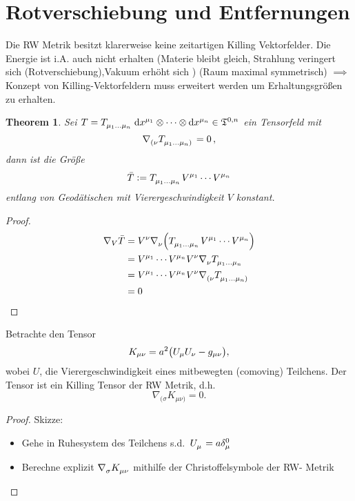 \documentclass[10pt,oneside,a4paper]{scrartcl}
\let\originalleft\left  %
\let\originalright\right
\renewcommand{\left}{\mathopen{}\mathclose\bgroup\originalleft}
\renewcommand{\right}{\aftergroup\egroup\originalright}
\newtheorem{theorem}{Theorem}
\theoremstyle{definition}
\theoremstyle{remark}
\begin{document}
\section{Rotverschiebung und Entfernungen}
Die RW Metrik besitzt klarerweise keine zeitartigen Killing Vektorfelder.
Die Energie ist i.A. auch nicht erhalten (Materie bleibt gleich, Strahlung
veringert sich (Rotverschiebung),Vakuum erhöht sich ) (Raum maximal symmetrisch)
$\implies$ Konzept von Killing-Vektorfeldern muss erweitert werden um
Erhaltungsgrößen zu erhalten.
\begin{theorem}
Sei
$T=\tensor{T}{_{\mu_1\dots\mu_n}}\dif\tensor{x}{^{\mu_1}}\otimes\cdots\otimes\dif\tensor{x}{^{\mu_n}}
\in\mathfrak{T}^{0,n}$
ein Tensorfeld mit 
\begin{equation}
\tensor{\nabla}{_{(\nu}}\tensor{T}{_{\mu_1\dots\mu_n)}}=0\,,
\end{equation}
dann ist die Größe
\begin{equation}
\bar{T}
:=\tensor{T}{_{\mu_1\dots\mu_n}}\tensor{V}{^{\mu_1}}\cdots\tensor{V}{^{\mu_n}}
\end{equation}
entlang von Geodätischen mit Vierergeschwindigkeit $V$ konstant.
\end{theorem}
\begin{proof}
\begin{equation}
\begin{split}
\nabla_V\bar{T}
&=\tensor{V}{^\nu}\tensor{\nabla}{_\nu}\left(\tensor{T}{_{\mu_1\dots\mu_n}}
\tensor{V}{^{\mu_1}}\cdots\tensor{V}{^{\mu_n}}\right)\\
&=\tensor{V}{^{\mu_1}}\cdots\tensor{V}{^{\mu_n}}
\tensor{V}{^\nu}\tensor{\nabla}{_\nu}\tensor{T}{_{\mu_1\dots\mu_n}}\\
&=\tensor{V}{^{\mu_1}}\cdots\tensor{V}{^{\mu_n}}
\tensor{V}{^\nu}\tensor{\nabla}{_{(\nu}}\tensor{T}{_{\mu_1\dots\mu_n)}}\\
&=0\\
\end{split}
\end{equation}
\end{proof}
Betrachte den Tensor
\begin{equation}\label{FLRWKillingTensor}
K_{\mu\nu}
=a^{2}\left(U_{\mu}U_{\nu}-g_{\mu\nu}\right),
\end{equation}
wobei $U$, die Vierergeschwindigkeit eines mitbewegten (comoving)
Teilchens.
Der Tensor ist ein Killing Tensor der RW Metrik, d.h.
\begin{equation}
\nabla_{(\sigma}K_{\mu\nu)}=0.
\end{equation}
\begin{proof}
Skizze:
\begin{itemize}
  \item Gehe in Ruhesystem des Teilchens s.d.\
  $\tensor{U}{_\mu}=a\delta_{\mu}^{0}$
  \item Berechne explizit $\tensor{\nabla}{_\sigma}\tensor{K}{_\mu_\nu}$
  mithilfe der Christoffelsymbole der RW- Metrik
\end{itemize}
\end{proof}
\end{document}
